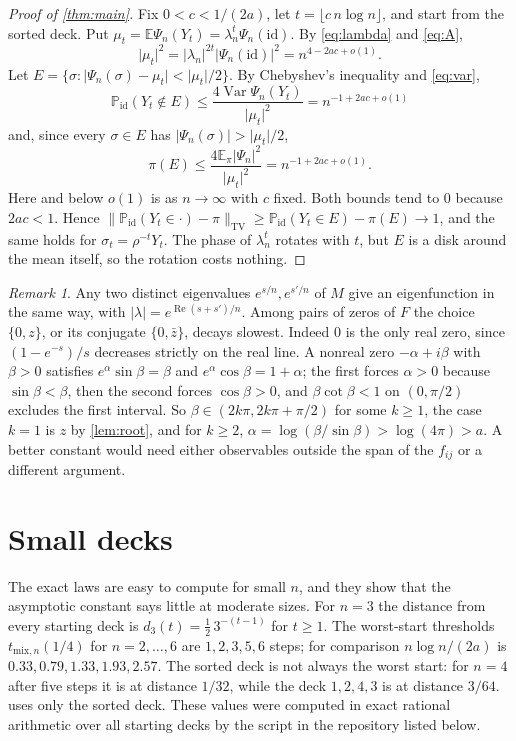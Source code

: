 \documentclass[11pt,a4paper]{article}
\numberwithin{equation}{section}
\theoremstyle{remark}
\newtheorem{remark}[theorem]{Remark}
\newcommand{\E}{\mathbb E}
\newcommand{\Pp}{\mathbb P}
\newcommand{\abs}[1]{\lvert#1\rvert}
\newcommand{\tv}[1]{\lVert#1\rVert_{\mathrm{TV}}}
\DeclareMathOperator{\Var}{Var}
\DeclareMathOperator{\re}{Re}
\begin{document}
\begin{proof}[Proof of \cref{thm:main}]
Fix $0<c<1/(2a)$, let $t=\lfloor c\,n\log n\rfloor$, and start from the sorted deck. Put $\mu_t=\E\Psi_n(Y_t)=\lambda_n^t\Psi_n(\mathrm{id})$. By \eqref{eq:lambda} and \eqref{eq:A},
\[
\abs{\mu_t}^2=\abs{\lambda_n}^{2t}\abs{\Psi_n(\mathrm{id})}^2=n^{4-2ac+o(1)} .
\]
Let $E=\{\sigma:\abs{\Psi_n(\sigma)-\mu_t}<\abs{\mu_t}/2\}$. By Chebyshev's inequality and \eqref{eq:var},
\[
\Pp_{\mathrm{id}}(Y_t\notin E)\le\frac{4\Var\Psi_n(Y_t)}{\abs{\mu_t}^2}=n^{-1+2ac+o(1)}
\]
and, since every $\sigma\in E$ has $\abs{\Psi_n(\sigma)}>\abs{\mu_t}/2$,
\[
\pi(E)\le\frac{4\E_\pi\abs{\Psi_n}^2}{\abs{\mu_t}^2}=n^{-1+2ac+o(1)} .
\]
Here and below $o(1)$ is as $n\to\infty$ with $c$ fixed. Both bounds tend to $0$ because $2ac<1$. Hence $\tv{\Pp_{\mathrm{id}}(Y_t\in\cdot)-\pi}\ge\Pp_{\mathrm{id}}(Y_t\in E)-\pi(E)\to1$, and the same holds for $\sigma_t=\rho^{-t}Y_t$. The phase of $\lambda_n^t$ rotates with $t$, but $E$ is a disk around the mean itself, so the rotation costs nothing.
\end{proof}

\begin{remark}\label{rem:other}
Any two distinct eigenvalues $e^{s/n},e^{s'/n}$ of $M$ give an eigenfunction in the same way, with $\abs{\lambda}=e^{\re(s+s')/n}$. Among pairs of zeros of $F$ the choice $\{0,z\}$, or its conjugate $\{0,\bar z\}$, decays slowest. Indeed $0$ is the only real zero, since $(1-e^{-s})/s$ decreases strictly on the real line. A nonreal zero $-\alpha+i\beta$ with $\beta>0$ satisfies $e^\alpha\sin\beta=\beta$ and $e^\alpha\cos\beta=1+\alpha$; the first forces $\alpha>0$ because $\sin\beta<\beta$, then the second forces $\cos\beta>0$, and $\beta\cot\beta<1$ on $(0,\pi/2)$ excludes the first interval. So $\beta\in(2k\pi,2k\pi+\pi/2)$ for some $k\ge1$, the case $k=1$ is $z$ by \cref{lem:root}, and for $k\ge2$, $\alpha=\log(\beta/\sin\beta)>\log(4\pi)>a$. A better constant would need either observables outside the span of the $f_{ij}$ or a different argument.
\end{remark}

\section{Small decks}\label{sec:small}

The exact laws are easy to compute for small $n$, and they show that the asymptotic constant says little at moderate sizes. For $n=3$ the distance from every starting deck is $d_3(t)=\frac12\,3^{-(t-1)}$ for $t\ge1$. The worst-start thresholds $t_{\mathrm{mix},n}(1/4)$ for $n=2,\dots,6$ are $1,2,3,5,6$ steps; for comparison $n\log n/(2a)$ is $0.33,0.79,1.33,1.93,2.57$. The sorted deck is not always the worst start: for $n=4$ after five steps it is at distance $1/32$, while the deck $1,2,4,3$ is at distance $3/64$.  uses only the sorted deck. These values were computed in exact rational arithmetic over all starting decks by the script in the repository listed below.
\end{document}
